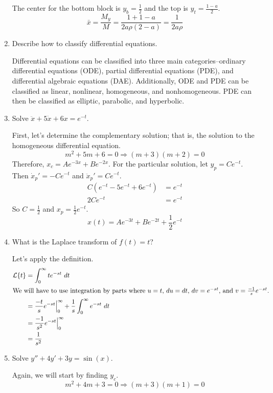 \begin{enumerate}
  The center for the bottom block is \(y_b = \frac{1}{2}\) and the top is
  \(y_t = \frac{1 - a}{2}\).
  \[
  \bar{x} = \frac{M_y}{M} = \frac{1 + 1 - a}{2a\rho(2 - a)} =
  \frac{1}{2a\rho}
  \]
\item
  Describe how to classify differential equations.
  \par\smallskip
  Differential equations can be classified into three main
  categories--ordinary differential equations (ODE), partial differential
  equations (PDE), and differential algebraic equations (DAE).
  Additionally, ODE and PDE can be classified as linear, nonlinear, homogeneous,
  and nonhomogeneous.
  PDE can then be classified as elliptic, parabolic, and hyperbolic.
\item
  Solve \(\ddot{x} + 5\dot{x} + 6x = e^{-t}\).
  \par\smallskip
  First, let's determine the complementary solution; that is, the solution to
  the homogeneous differential equation.
  \[
  m^2 + 5m + 6 = 0\Rightarrow (m + 3)(m + 2) = 0
  \]
  Therefore, \(x_c = Ae^{-3x} + Be^{-2x}\).
  For the particular solution, let \(y_p = Ce^{-t}\).
  Then \(\dot{x}_p' = -Ce^{-t}\) and \(\ddot{x}_p' = Ce^{-t}\).
  \begin{align*}
    C(e^{-t} - 5e^{-t} + 6e^{-t}) &= e^{-t}\\
    2Ce^{-t} &= e^{-t}
  \end{align*}
  So \(C = \frac{1}{2}\) and \(x_p = \frac{1}{2}e^{-t}\).
  \[
  x(t) = Ae^{-3t} + Be^{-2t} + \frac{1}{2}e^{-t}
  \]
\item
  What is the Laplace transform of \(f(t) = t\)?
  \par\smallskip
  Let's apply the definition.
  \begin{align*}
    \mathcal{L}\{t\} &= \int_0^{\infty}te^{-st} \ dt\\
    \intertext{We will have to use integration by parts where \(u = t\),
    \(du = dt\), \(dv = e^{-st}\), and \(v = \frac{-1}{s}e^{-st}\).}
                     &= \frac{-t}{s}e^{-st}\Big|_0^{\infty} +
                        \frac{1}{s}\int_0^{\infty}e^{-st} \ dt\\
                     &= \frac{-1}{s^2}e^{-st}\Big|_0^{\infty}\\
                     &= \frac{1}{s^2}
  \end{align*}
\item
  Solve \(y'' + 4y' + 3y = \sin(x)\).
  \par\smallskip
  Again, we will start by finding \(y_c\).
  \[
  m^2 + 4m + 3 = 0\Rightarrow (m + 3)(m + 1) = 0
\]
\end{enumerate}
